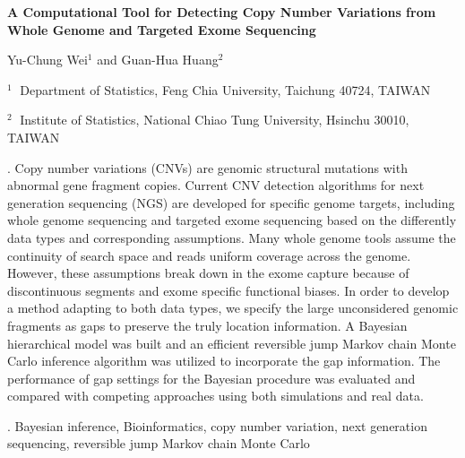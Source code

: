 \documentclass[12pt]{article}
\begin{document}
\begin{flushleft}


{\LARGE\bf A Computational Tool for Detecting Copy Number Variations from Whole Genome and Targeted Exome Sequencing}


\vspace{1.0cm}

Yu-Chung Wei$^1$ and Guan-Hua Huang$^2$

\begin{description}

\item $^1 \;$ Department of Statistics, Feng Chia University,
Taichung 40724, TAIWAN


\item $^2 \;$ Institute of Statistics, National Chiao Tung University, 
Hsinchu 30010, TAIWAN

\end{description}

\end{flushleft}


\vspace{0.75cm}

. Copy number variations (CNVs) are genomic structural mutations with abnormal gene fragment copies. Current CNV detection algorithms for next generation sequencing (NGS) are developed for specific genome targets, including whole genome sequencing and targeted exome sequencing based on the differently data types and corresponding assumptions. Many whole genome tools assume the continuity of search space and reads uniform coverage across the genome. However, these assumptions break down in the exome capture because of discontinuous segments and exome specific functional biases. In order to develop a method adapting to both data types, we specify the large unconsidered genomic fragments as gaps to preserve the truly location information. A Bayesian hierarchical model was built and an efficient reversible jump Markov chain Monte Carlo inference algorithm was utilized to incorporate the gap information. The performance of gap settings for the Bayesian procedure was evaluated and compared with competing approaches using both simulations and real data.

\vskip 2mm

.
Bayesian inference, Bioinformatics, copy number variation, next generation sequencing, reversible jump Markov chain Monte Carlo
\end{document}
